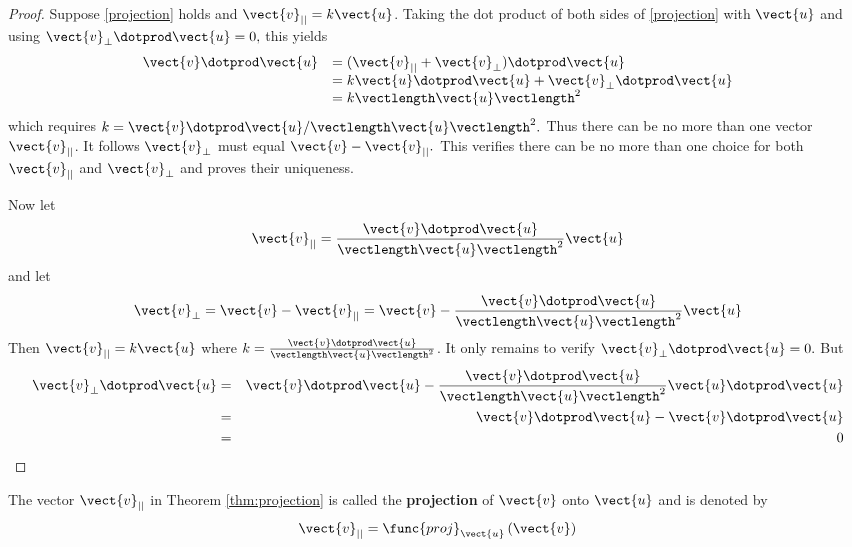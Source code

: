 \begin{proof}
Suppose \ref{projection} holds and $\vect{v}_{||}= k \vect{u}$.
 Taking the dot product of both sides of \ref{projection} with $\vect{u}$ and using $\vect{v}_{\bot }\dotprod \vect{u}=0,$
 this yields
\begin{equation*}
\begin{array}{ll}
\vect{v}\dotprod \vect{u} & = ( \vect{v}_{||}+\vect{v}_{\bot }) \dotprod \vect{u} \\
& =  k\vect{u} \dotprod \vect{u} + \vect{v}_{\bot} \dotprod \vect{u} \\
& = k \vectlength \vect{u}\vectlength ^{2}
\end{array}
\end{equation*}
which requires $k =\vect{v}\dotprod \vect{u} / \vectlength \vect{u}\vectlength ^{2}.$
Thus there can be no more than one vector $\vect{v}_{||}$. It follows 
$\vect{v}_{\bot }$ must equal $\vect{v}-\vect{v}_{||}.$ This verifies there can
be no more than one choice for both $\vect{v}_{||}$ and $\vect{v}_{\bot
}$ and proves their uniqueness. 

Now let
\begin{equation*}
\vect{v}_{||} = 
\frac{\vect{v}\dotprod \vect{u}}{\vectlength \vect{u}\vectlength ^{2}}\vect{u}
\end{equation*}
and let
\begin{equation*}
\vect{v}_{\bot }=\vect{v}-\vect{v}_{||}=\vect{v}-\frac{\vect{v}\dotprod \vect{u}}
{\vectlength \vect{u}\vectlength ^{2}}\vect{u}
\end{equation*}
Then $\vect{v}_{||}= k\vect{u}$ where $k =\frac{\vect{v}\dotprod \vect{u}}{\vectlength \vect{u}\vectlength ^{2}}$.
 It only remains to
verify $\vect{v}_{\bot }\dotprod \vect{u}=0.$ But
\begin{eqnarray*}
\vect{v}_{\bot }\dotprod \vect{u} &=& \vect{v}\dotprod \vect{u}-\frac{\vect{v}\dotprod \vect{u}}{\vectlength \vect{u}\vectlength ^{2}}\vect{u}\dotprod \vect{u} \\
&=& \vect{v}\dotprod\vect{u}-\vect{v}\dotprod \vect{u}\\
&=& 0 
\end{eqnarray*}
\end{proof}

The vector $\vect{v}_{||}$ in Theorem \ref{thm:projection} is called the \textbf{projection}
of $\vect{v}$ onto $\vect{u}$ and is denoted by
\begin{equation*}
\vect{v}_{||}
=
\func{proj}_{\vect{u}}\left( \vect{v}\right)
\end{equation*}

